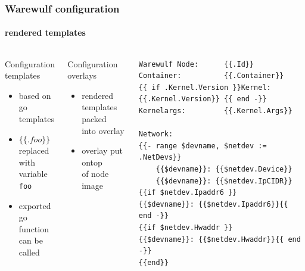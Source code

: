 \documentclass[aspectratio=169]{beamer}
\begin{document}
\begin{frame}[fragile]
\frametitle{Warewulf configuration}
\framesubtitle{rendered templates}
\begin{columns}
\begin{block}{Configuration templates}
  \begin{itemize}
    \item based on go templates
    \item $\{\{ .foo \}\}$ replaced \\
    with variable \texttt{foo}
    \item exported go function \\
    can be called
  \end{itemize}
\end{block}
\begin{block}{Configuration overlays}
\begin{itemize}
  \item rendered templates packed\\
  into overlay
  \item overlay put ontop \\
  of node image
\end{itemize}
\end{block}
\begin{lstlisting}[style=ww,caption=/etc/issue.ww]
Warewulf Node:      {{.Id}}
Container:          {{.Container}}
{{ if .Kernel.Version }}Kernel:             {{.Kernel.Version}} {{ end -}}
Kernelargs:         {{.Kernel.Args}}

Network:
{{- range $devname, $netdev := .NetDevs}}
    {{$devname}}: {{$netdev.Device}}
    {{$devname}}: {{$netdev.IpCIDR}}
{{if $netdev.Ipaddr6 }}    {{$devname}}: {{$netdev.Ipaddr6}}{{ end -}}
{{if $netdev.Hwaddr }}    {{$devname}}: {{$netdev.Hwaddr}}{{ end -}}
{{end}}
\end{lstlisting}
\end{columns}
\end{frame}
\end{document}
